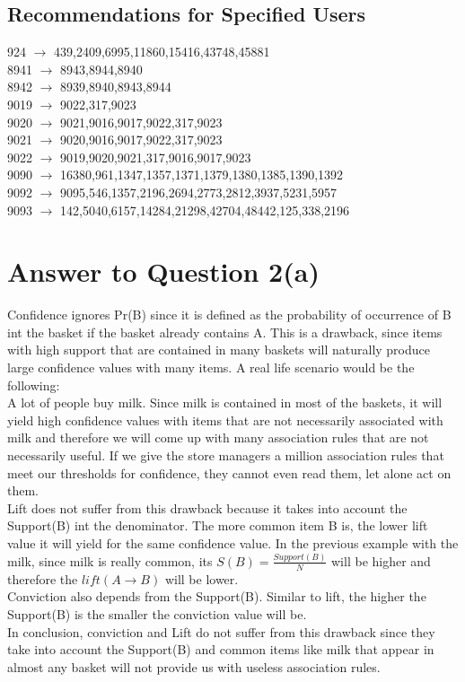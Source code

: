 \documentclass[11pt]{article}
\begin{document}
\subsection*{Recommendations for Specified Users}
924	$\rightarrow$	439,2409,6995,11860,15416,43748,45881 \\
8941 $\rightarrow$	8943,8944,8940 \\
8942 $\rightarrow$	8939,8940,8943,8944\\
9019 $\rightarrow$   9022,317,9023\\
9020 $\rightarrow$	9021,9016,9017,9022,317,9023\\
9021 $\rightarrow$	9020,9016,9017,9022,317,9023\\
9022 $\rightarrow$	9019,9020,9021,317,9016,9017,9023\\
9090 $\rightarrow$	16380,961,1347,1357,1371,1379,1380,1385,1390,1392\\
9092 $\rightarrow$	9095,546,1357,2196,2694,2773,2812,3937,5231,5957\\
9093 $\rightarrow$	142,5040,6157,14284,21298,42704,48442,125,338,2196\\

\pagebreak[4]
\section*{Answer to Question 2(a)}
Confidence ignores Pr(B) since it is defined as the probability of occurrence of B int the basket if the basket already contains A. This is a drawback, since items with high support that are contained in many baskets will naturally produce large confidence values with many items. A real life scenario would be the following:\\
A lot of people buy milk. Since milk is contained in most of the baskets, it will yield high confidence values with items that are not necessarily associated with milk and therefore we will come up with many association rules that are not necessarily useful. If we give the store managers a million association rules that meet our thresholds for confidence, they cannot even read them, let alone act on them. \\
Lift does not suffer from this drawback because it takes into account the Support(B) int the denominator. The more common item B is, the lower lift value it will yield for the same confidence value. In the previous example with the milk, since milk is really common, its $S(B) = \frac{Support(B)}{N}$ will be higher and therefore the $lift(A\rightarrow B)$ will be lower.\\
Conviction also depends from the Support(B). Similar to lift, the higher the Support(B) is the smaller the conviction value will be.\\
In conclusion, conviction and Lift do not suffer from this drawback since they take into account the Support(B) and common items like milk that appear in almost any basket will not provide us with useless association rules.
\pagebreak[4]
\end{document}
